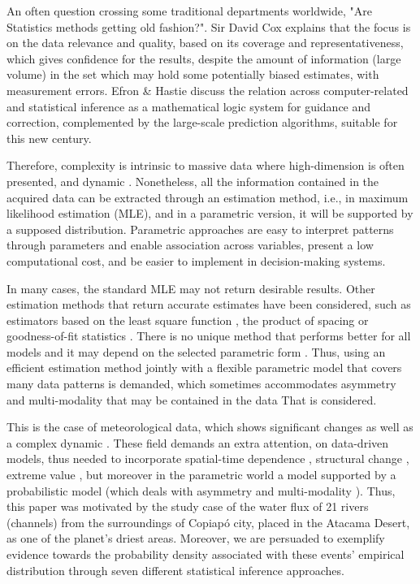 \documentclass[]{interact}
\theoremstyle{plain}%
\theoremstyle{definition}
\theoremstyle{remark}
\begin{document}
An often question crossing some traditional departments worldwide, "Are Statistics methods getting old fashion?". Sir David Cox \cite{cox2018big} explains that the focus is on the data relevance and quality, based on its coverage and representativeness, which gives confidence for the results, despite the amount of information (large volume) in the set which may hold some potentially biased estimates, with measurement errors. Efron \& Hastie \cite{efron2016computer} discuss the relation across computer-related and statistical inference as a mathematical logic system for guidance and correction, complemented by the large-scale prediction algorithms, suitable for this new century.

Therefore, complexity is intrinsic to massive data where high-dimension is often presented, and dynamic \cite{leonelli2020coherent, smith1987decision}. Nonetheless, all the information contained in the acquired data can be extracted through an estimation method, i.e., in maximum likelihood estimation  (MLE), and in a parametric version, it will be supported by a supposed distribution. Parametric approaches are easy to interpret patterns through parameters and enable association across variables, present a low computational cost, and be easier to implement in decision-making systems. 

In many cases, the standard MLE may not return desirable results. Other estimation methods that return accurate estimates have been considered, such as estimators based on the least square function \cite{swain1988least}, the product of spacing \cite{cheng1979maximum,ranneby1984maximum} or goodness-of-fit statistics \cite{luceno2006fitting}. There is no unique method that performs better for all models and it may depend on the selected parametric form \cite{ramos2019modeling, louzada2020exponential}.  Thus, using an efficient estimation method jointly with a flexible parametric model that covers many data patterns is demanded, which sometimes accommodates asymmetry and multi-modality that may be contained in the data That is considered.

This is the case of meteorological data, which shows significant changes as well as a complex dynamic \cite{bonnail2018trapping, du2019precipitation}. These field demands an extra attention, on data-driven models, thus needed to incorporate spatial-time dependence \cite{lopes2008spatial}, structural change \cite{mutti2020ndvi}, extreme value \cite{dutfoy2014multivariate}, but moreover in the parametric world a model supported by a probabilistic model (which deals with asymmetry and multi-modality \cite{ramoslouzada2016, rodrigues2018poisson}). Thus, this paper was motivated by the study case of the water flux of 21 rivers (channels) from the surroundings of Copiapó city, placed in the Atacama Desert, as one of the planet's driest areas. Moreover, we are persuaded to exemplify evidence towards the probability density associated with these events' empirical distribution through seven different statistical inference approaches.
\end{document}
